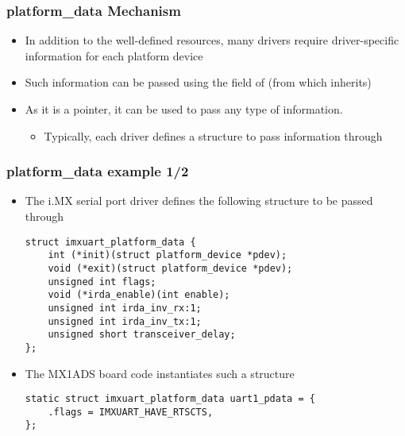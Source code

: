 \begin{frame}
  \frametitle{platform\_data Mechanism}
  \begin{itemize}
  \item In addition to the well-defined resources, many drivers
    require driver-specific information for each platform device
  \item Such information can be passed using the 
    field of  (from which
     inherits)
  \item As it is a  pointer, it can be used to pass any
    type of information.
    \begin{itemize}
    \item Typically, each driver defines a structure to pass
      information through 
    \end{itemize}
  \end{itemize}
\end{frame}

\begin{frame}[fragile]
  \frametitle{platform\_data example 1/2}
  \begin{itemize}
  \item The i.MX serial port driver defines the following structure to
    be passed through 

  \begin{verbatim}
struct imxuart_platform_data {
    int (*init)(struct platform_device *pdev);
    void (*exit)(struct platform_device *pdev);
    unsigned int flags;
    void (*irda_enable)(int enable);
    unsigned int irda_inv_rx:1;
    unsigned int irda_inv_tx:1;
    unsigned short transceiver_delay;
};
  \end{verbatim}
  \item The MX1ADS board code instantiates such a structure
  \begin{verbatim}
static struct imxuart_platform_data uart1_pdata = {
    .flags = IMXUART_HAVE_RTSCTS,
};
  \end{verbatim}
  \end{itemize}
\end{frame}


